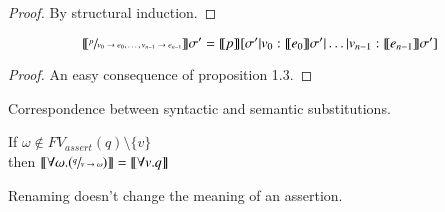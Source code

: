 \documentclass{report}[12pt]
\begin{document}
\begin{proof}
    By structural induction.
\end{proof}
\begin{proposition}
    \[\llbracket  \sfrac{p}{v_0 \rightarrow e_0, \ldots, v_{n-1} \rightarrow e_{n-1}} \rrbracket\sigma' = \llbracket  p  \rrbracket [\sigma'|v_0:\llbracket  e_0  \rrbracket \sigma' | \ldots | v_{n-1}:\llbracket  e_{n-1} \rrbracket \sigma']\]
\end{proposition}
\begin{proof}
    An easy consequence of proposition 1.3.
\end{proof}
Correspondence between syntactic and semantic substitutions.
\begin{proposition}[Renaming]
    If $\omega \notin FV_{assert}(q)\setminus \{v\}$ \\
    then $\llbracket  \forall \omega. (\sfrac{q}{v\rightarrow \omega}) \rrbracket = \llbracket  \forall v. q  \rrbracket$
\end{proposition}
Renaming doesn't change the meaning of an assertion.
\end{document}
